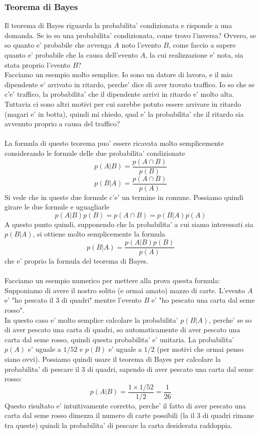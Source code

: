 \documentclass[12pt]{article}
\begin{document}
\subsubsection{Teorema di Bayes}
Il teorema di Bayes riguarda la probabilita' condizionata e risponde a una domanda. Se io so una probabilita' condizionata, come trovo l'inversa? Ovvero, se so quanto e' probabile che avvenga $A$ noto l'evento $B$, come faccio a sapere quanto e' probabile che la causa dell'evento $A$, la cui realizzazione e' nota, sia stata proprio l'evento $B$? \\
Facciamo un esempio molto semplice. Io sono un datore di lavoro, e il mio dipendente e' arrivato in ritardo, perche' dice di aver trovato traffico. Io so che se c'e' traffico, la probabilita' che il dipendente arrivi in ritardo e' molto alta. Tuttavia ci sono altri motivi per cui sarebbe potuto essere arrivare in ritardo (magari e' in botta), quindi mi chiedo, qual e' la probabilita' che il ritardo sia avvenuto proprio a causa del traffico? \\ \\
La formula di questo teorema puo' essere ricavata molto semplicemente considerando le formule delle due probabilita' condizionate
$$
	p(A|B) = \frac{p(A\cap B)}{p(B)}
$$
$$
	p(B|A) = \frac{p(A\cap B)}{p(A)}
$$
Si vede che in queste due formule c'e' un termine in comune. Possiamo quindi girare le due formule e uguagliarle
$$
	p(A|B)p(B) = p(A\cap B) = p(B|A)p(A)
$$
A questo punto quindi, supponendo che la probabilita' a cui siamo interessati sia $p(B|A)$, si ottiene molto semplicemente la formula
$$
	p(B|A) = \frac{p(A|B)p(B)}{p(A)}
$$	
che e' proprio la formula del teorema di Bayes. \\ \\
Facciamo un esempio numerico per mettere alla prova questa formula: \\
Supponiamo di avere il nostro solito (e ormai amato) mazzo di carte. L'evento $A$ e' "ho pescato il 3 di quadri" mentre l'evento $B$ e' "ho pescato una carta dal seme rosso". \\
In questo caso e' molto semplice calcolare la probabilita' $p(B|A)$, perche' se so di aver pescato una carta di quadri, so automaticamente di aver pescato una carta dal seme rosso, quindi questa probabilita' e' unitaria. La probabilita' $p(A)$ e' uguale a $1/52$ e $p(B)$ e' uguale a $1/2$ (per motivi che ormai penso siano ovvi). Possiamo quindi usare il teorema di Bayes per calcolare la probabilita' di pescare il 3 di quadri, sapendo di aver pescato una carta dal seme rosso:
$$
	p(A|B) = \frac{1 \times 1/52}{1/2} = \frac{1}{26}
$$
Questo risultato e' intuitivamente corretto, perche' il fatto di aver pescato una carta dal seme rosso dimezza il numero di carte possibili (la il 3 di quadri rimane tra queste) quindi la probabilita' di pescare la carta desiderata raddoppia.
\end{document}
